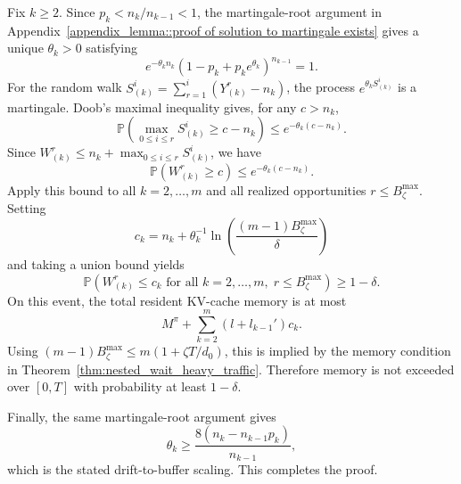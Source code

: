 Fix \(k\ge2\). Since \(p_k<n_k/n_{k-1}<1\), the martingale-root argument in Appendix~\ref{appendix_lemma::proof of solution to martingale exists} gives a unique \(\theta_k>0\) satisfying
\[
    e^{-\theta_k n_k}(1-p_k+p_ke^{\theta_k})^{n_{k-1}}=1.
\]
For the random walk \(S^i_{(k)}=\sum_{r=1}^i(Y^r_{(k)}-n_k)\), the process \(e^{\theta_k S^i_{(k)}}\) is a martingale. Doob's maximal inequality gives, for any \(c>n_k\),
\[
    \mathbb{P}\!\left(\max_{0\le i\le r}S^i_{(k)}\ge c-n_k\right)
    \le
    e^{-\theta_k(c-n_k)}.
\]
Since \(W^r_{(k)}\le n_k+\max_{0\le i\le r}S^i_{(k)}\), we have
\[
    \mathbb{P}(W^r_{(k)}\ge c)
    \le
    e^{-\theta_k(c-n_k)}.
\]
Apply this bound to all \(k=2,\ldots,m\) and all realized opportunities \(r\le B_\zeta^{\max}\). Setting
\[
    c_k
    =
    n_k+\theta_k^{-1}\ln\!\left(\frac{(m-1)B_\zeta^{\max}}{\delta}\right)
\]
and taking a union bound yields
\[
    \mathbb{P}\!\left(
    W^r_{(k)}\le c_k
    \text{ for all } k=2,\ldots,m,\; r\le B_\zeta^{\max}
    \right)\ge1-\delta.
\]
On this event, the total resident KV-cache memory is at most
\[
    M^\pi+\sum_{k=2}^m (l+l_{k-1}')c_k.
\]
Using \((m-1)B_\zeta^{\max}\le m(1+\zeta T/d_0)\), this is implied by the memory condition in Theorem~\ref{thm:nested_wait_heavy_traffic}. Therefore memory is not exceeded over \([0,T]\) with probability at least \(1-\delta\).

Finally, the same martingale-root argument gives
\[
    \theta_k\ge \frac{8(n_k-n_{k-1}p_k)}{n_{k-1}},
\]
which is the stated drift-to-buffer scaling. This completes the proof.

